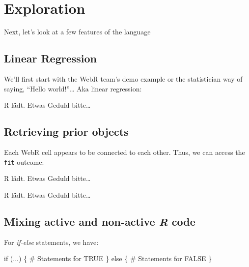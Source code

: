 \documentclass[
  letterpaper,
  DIV=11,
  oneside]{scrreprt}
\newenvironment{Shaded}{\begin{snugshade}}{\end{snugshade}}
\newcommand{\CommentTok}[1]{\textcolor[rgb]{0.37,0.37,0.37}{#1}}
\newcommand{\ControlFlowTok}[1]{\textcolor[rgb]{0.00,0.23,0.31}{#1}}
\newcommand{\NormalTok}[1]{\textcolor[rgb]{0.00,0.23,0.31}{#1}}
\begin{document}
\hypertarget{exploration}{%
\section{Exploration}\label{exploration}}

Next, let's look at a few features of the language

\hypertarget{linear-regression}{%
\subsection{Linear Regression}\label{linear-regression}}

We'll first start with the WebR team's demo example or the statistician
way of saying, ``Hello world!''\ldots{} Aka linear regression:

R lädt. Etwas Geduld bitte\ldots{}

\hypertarget{webr-editor-1}{}

\hypertarget{webr-code-output-1}{}

\hypertarget{retrieving-prior-objects}{%
\subsection{Retrieving prior objects}\label{retrieving-prior-objects}}

Each WebR cell appears to be connected to each other. Thus, we can
access the \texttt{fit} outcome:

R lädt. Etwas Geduld bitte\ldots{}

\hypertarget{webr-editor-2}{}

\hypertarget{webr-code-output-2}{}

R lädt. Etwas Geduld bitte\ldots{}

\hypertarget{webr-editor-3}{}

\hypertarget{webr-code-output-3}{}

\hypertarget{mixing-active-and-non-active-r-code}{%
\subsection{\texorpdfstring{Mixing active and non-active \emph{R}
code}{Mixing active and non-active R code}}\label{mixing-active-and-non-active-r-code}}

For \emph{if-else} statements, we have:

\begin{Shaded}
\begin{Highlighting}[]
\ControlFlowTok{if}\NormalTok{ (...) \{}
  \CommentTok{\# Statements for TRUE}
\NormalTok{\} }\ControlFlowTok{else}\NormalTok{ \{}
  \CommentTok{\# Statements for FALSE}
\NormalTok{\}}
\end{Highlighting}
\end{Shaded}
\end{document}
